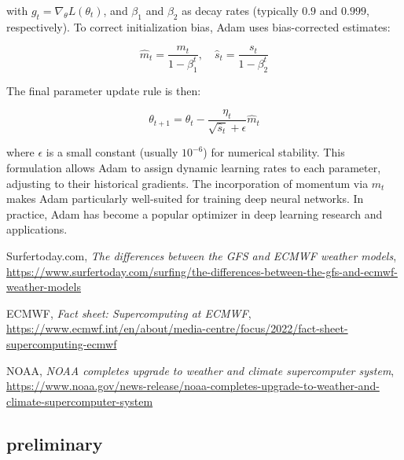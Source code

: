 \documentclass[11pt]{article}
\begin{document}
with \( g_t = \nabla_{\theta} L(\theta_t) \), and \( \beta_1 \) and \( \beta_2 \) as decay rates (typically \( 0.9 \) and \( 0.999 \), respectively). To correct initialization bias, Adam uses bias-corrected estimates:

\[
\hat{m}_t = \frac{m_t}{1 - \beta_1^t},\quad \hat{s}_t = \frac{s_t}{1 - \beta_2^t}
\]

The final parameter update rule is then:

\[
\theta_{t+1} = \theta_t - \frac{\eta_t}{\sqrt{\hat{s}_t} + \epsilon} \hat{m}_t
\]

where \( \epsilon \) is a small constant (usually \( 10^{-6} \)) for numerical stability. This formulation allows Adam to assign dynamic learning rates to each parameter, adjusting to their historical gradients. The incorporation of momentum via \( m_t \) makes Adam particularly well-suited for training deep neural networks. In practice, Adam has become a popular optimizer in deep learning research and applications.


\begin{thebibliography}{9}

Surfertoday.com, 
\textit{The differences between the GFS and ECMWF weather models}, 
\url{https://www.surfertoday.com/surfing/the-differences-between-the-gfs-and-ecmwf-weather-models}

ECMWF, 
\textit{Fact sheet: Supercomputing at ECMWF}, 
\url{https://www.ecmwf.int/en/about/media-centre/focus/2022/fact-sheet-supercomputing-ecmwf}

NOAA, 
\textit{NOAA completes upgrade to weather and climate supercomputer system}, 
\url{https://www.noaa.gov/news-release/noaa-completes-upgrade-to-weather-and-climate-supercomputer-system}

\end{thebibliography}

\subsection*{preliminary}
\end{document}
